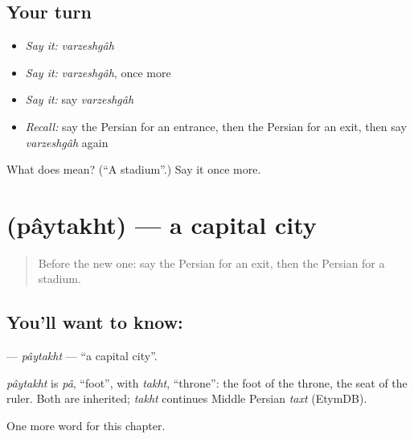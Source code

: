 \subsection*{Your turn}
\begin{itemize}
\raggedright
  \item \emph{Say it:} \emph{varzeshgâh}
  \item \emph{Say it:} \emph{varzeshgâh}, once more
  \item \emph{Say it:} say \emph{varzeshgâh}
  \item \emph{Recall:} say the Persian for an entrance, then the Persian for an exit, then say \emph{varzeshgâh} again
\end{itemize}

\begin{tcolorbox}[breakable,colback=teal!4,colframe=teal!35!black,title={Before you move on}]
What does  mean? (\textquotedblleft{}A stadium\textquotedblright{}.) Say it once more.
\end{tcolorbox}
\section[\texorpdfstring{\fa{پایتخت} (pâytakht)}{پایتخت (pâytakht)}]{ (pâytakht) — a capital city}

\label{lesson:FA-C267-paytakht}



\begin{quote}
Before the new one: say the Persian for an exit, then the Persian for a stadium.
\end{quote}

\subsection*{You'll want to know: }
\textbf{} — \emph{pâytakht} — \textquotedblleft{}a capital city\textquotedblright{}.

\begin{cousinweb}
\emph{pâytakht} is \emph{pâ}, \textquotedblleft{}foot\textquotedblright{}, with \emph{takht}, \textquotedblleft{}throne\textquotedblright{}: the foot of the throne, the seat of the ruler. Both are inherited; \emph{takht} continues Middle Persian \emph{taxt} (EtymDB).
\end{cousinweb}

\begin{grammarlens}[title={What you've built}]
One more word for this chapter.
\end{grammarlens}

